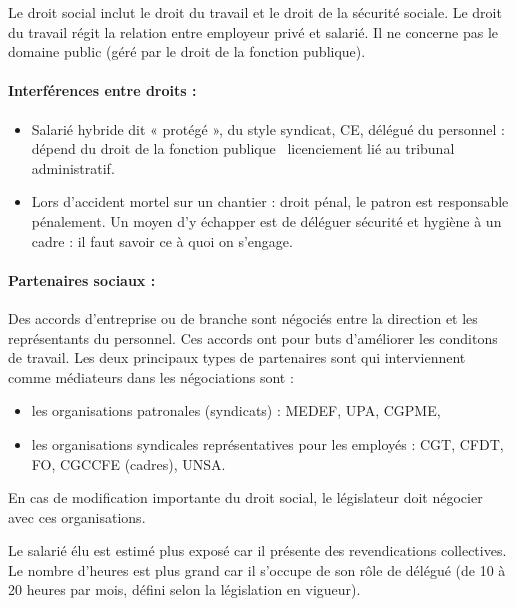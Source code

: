 Le droit social inclut le droit du travail et le droit de la sécurité sociale.
Le droit du travail régit la relation entre employeur privé et salarié.
Il ne concerne pas le domaine public (géré par le droit de la fonction publique).

\paragraph{Interférences entre droits :}
	\noindent\begin{itemize}
		\item[\textbullet] Salarié hybride dit « protégé », du style syndicat, CE, délégué du personnel : dépend du droit de la fonction publique \textrightarrow\ licenciement lié au tribunal administratif.
		\item[\textbullet] Lors d’accident mortel sur un chantier : droit pénal, le patron est responsable pénalement. Un moyen d'y échapper est de déléguer sécurité et hygiène à un cadre : il faut savoir ce à quoi on s'engage.
	\end{itemize}

\paragraph{Partenaires sociaux :}
	Des accords d'entreprise ou de branche sont négociés entre la direction et les représentants du personnel.
	Ces accords ont pour buts d'améliorer les conditons de travail.
	Les deux principaux types de partenaires sont qui interviennent comme médiateurs dans les négociations sont :
	\begin{itemize}
		\item[\textbullet] les organisations patronales (syndicats) : MEDEF, UPA, CGPME,
		\item[\textbullet] les organisations syndicales représentatives pour les employés : CGT, CFDT, FO, CGCCFE (cadres), UNSA.
	\end{itemize}
	En cas de modification importante du droit social, le législateur doit négocier avec ces organisations.

	Le salarié élu est estimé plus exposé car il présente des revendications collectives.
	Le nombre d'heures est plus grand car il s'occupe de son rôle de délégué (de 10 à 20 heures par mois, défini selon la législation en vigueur).